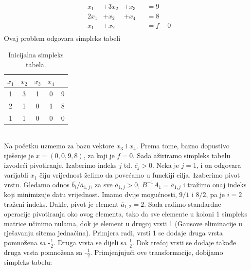 \documentclass[a4paper, utf8, 11pt, colorlinks]{article}
\begin{document}
\begin{align*}
    & x_1    & + 3x_2  &+ x_3& &= 9 \\
    & 2 x_1 &   + x_2  & + x_4& &= 8 \\
    & x_1   &   + x_2  &\  & &= f - 0 \\
\end{align*}
 Ovaj problem odgovara simpleks tabeli \\
 \begin{table}[!ht]
     \centering
     \begin{tabular}{c c c c | c}
     	 $x_1$ & $x_2$ &  $x_3$ & $x_4$ & \\ \hline
         1 &  3  & 1 & 0 & 9 \\
         2 &  1  & 0 & 1 & 8 \\ \hline
         1 &  1  & 0  & 0 & 0 \\ \hline
     \end{tabular}
     \caption{Inicijalna simpleks tabela.}
     \label{tab:simpleks_tabela1}
 \end{table} \\
 Na početku uzmemo za bazu vektore $x_3$ i $x_4$. Prema tome, bazno dopustivo rješenje je $x = (0, 0, 9, 8)$, za koji je $f =0$. Sada ažiriramo simpleks tabelu izvodeći pivotiranje. Izaberimo indeks $j$ td. $\overline{c_j}>0$. Neka je $j=1$, i on odgovara varijabli $x_1$ čiju vrijednost želimo da povećamo u funckiji cilja. Izaberimo pivot vrstu. Gledamo odnos $\overline{b_i}/\overline{a}_{1,j}$, za sve $\overline{a}_{1,j} > 0$,  $B^{-1} A_1 = \overline{a}_{1,j}$
 i tražimo onaj indeks koji minimizuje datu vrijednost. Imamo dvije mogućnosti, $9/1$ i $8/2$, pa je $i = 2$ traženi indeks. Dakle, pivot je element $\overline{a}_{1,2}=2$. Sada radimo standardne operacije pivotiranja oko ovog elementa,  tako da sve elemente u koloni 1 simpleks matrice učinimo nulama, dok je element u drugoj vrsti 1 (Gausove eliminacije u rješavanju sitema jednačina). Primjera radi, vrsti 1 se dodaje druga vrsta pomnožena sa -$\frac{1}{2}$. Druga vrsta se dijeli sa $\frac{1}{2}$. Dok trećoj vrsti se dodaje takođe druga vrsta pomnožena sa -$\frac{1}{2}$. 
 Primjenjujući ove transformacije, dobijamo simpleks tabelu:
 
\end{document}

